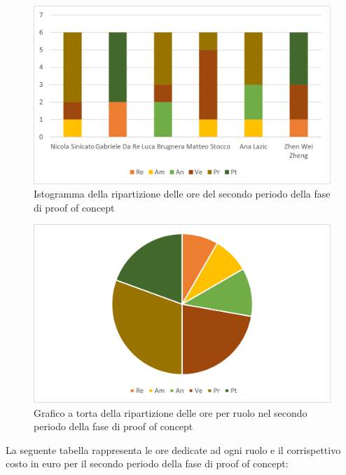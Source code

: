\begin{figure}[H]
    \centering
    \includegraphics[scale=0.6]{img/grafi preventivo/istogrammi/proof/periodo2.png}
    \caption{Istogramma della ripartizione delle ore del secondo periodo della fase di proof of concept}
\end{figure}
\begin{figure}[H]
    \centering
    \includegraphics[scale=0.6]{img/grafi preventivo/torta/proof/periodo2.png}
    \caption{Grafico a torta della ripartizione delle ore per ruolo nel secondo periodo della fase di proof of concept}
\end{figure}
La seguente tabella rappresenta le ore dedicate ad ogni ruolo e il corrispettivo costo in euro per il secondo periodo della fase di proof of concept:

